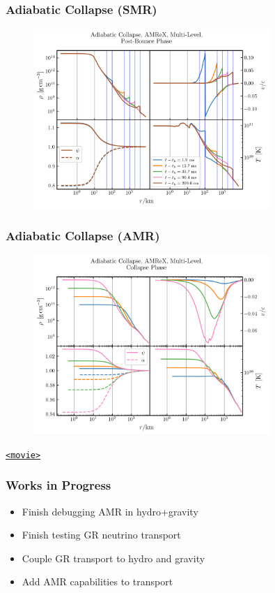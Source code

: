 \documentclass{beamer}
\begin{document}
\begin{frame}
\frametitle{Adiabatic Collapse (SMR)}

  \begin{figure}[htb!]
    \centering
    \includegraphics[width=0.8\textwidth]{fig.PostBounce.png}
  \end{figure}

\end{frame}

\begin{frame}
\frametitle{Adiabatic Collapse (AMR)}

  \begin{figure}[htb!]
    \centering
    \includegraphics[width=0.8\textwidth]{fig.Collapse_amr.png}
  \end{figure}

  \href{mov.AdiabaticCollapse_amr.mp4}{\nolinkurl{<movie>}}

\end{frame}

\begin{frame}
\frametitle{Works in Progress}

  \begin{itemize}
    \item
      Finish debugging AMR in hydro+gravity
    \item
      Finish testing GR neutrino transport
    \item
      Couple GR transport to hydro and gravity
    \item
      Add AMR capabilities to transport
  \end{itemize}

\end{frame}
\end{document}
